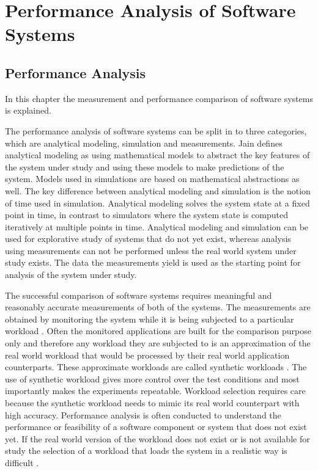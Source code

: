 \chapter{Performance Analysis of Software Systems}
\label{chapter:perfanalysis}
\section{Performance Analysis}
In this chapter the measurement and performance comparison of software systems
is explained.

The performance analysis of software systems can be split in to three
categories, which are analytical modeling, simulation and measurements. Jain
\cite{jain1991art} defines analytical modeling as using mathematical models to
abstract the key features of the system under study and using these models to
make predictions of the system. Models used in simulations are based on
mathematical abstractions as well. The key difference between analytical
modeling and simulation is the notion of time used in simulation. Analytical
modeling solves the system state at a fixed point in time, in contrast to
simulators where the system state is computed iteratively at multiple points in
time. Analytical modeling and simulation can be used for explorative study of
systems that do not yet exist, whereas analysis using measurements can not be
performed unless the real world system under study exists. The data the
measurements yield is used as the starting point for analysis of the system
under study. \cite{jain1991art}

The successful comparison of software systems requires meaningful and reasonably
accurate measurements of both of the systems. The measurements are obtained by
monitoring the system while it is being subjected to a particular workload
\cite{jain1991art}. Often the monitored applications are built for the
comparison purpose only and therefore any workload they are subjected to is an
approximation of the real world workload that would be processed by their real
world application counterparts. These approximate workloads are called synthetic
workloads \cite{jain1991art}. The use of synthetic workload gives more control
over the test conditions and most importantly makes the experiments repeatable.
Workload selection requires care because the synthetic workload needs to mimic
its real world counterpart with high accuracy. Performance analysis is often
conducted to understand the performance or feasibility of a software component
or system that does not exist yet. If the real world version of the workload
does not exist or is not available for study the selection of a workload that
loads the system in a realistic way is difficult \cite{jain1991art}.

